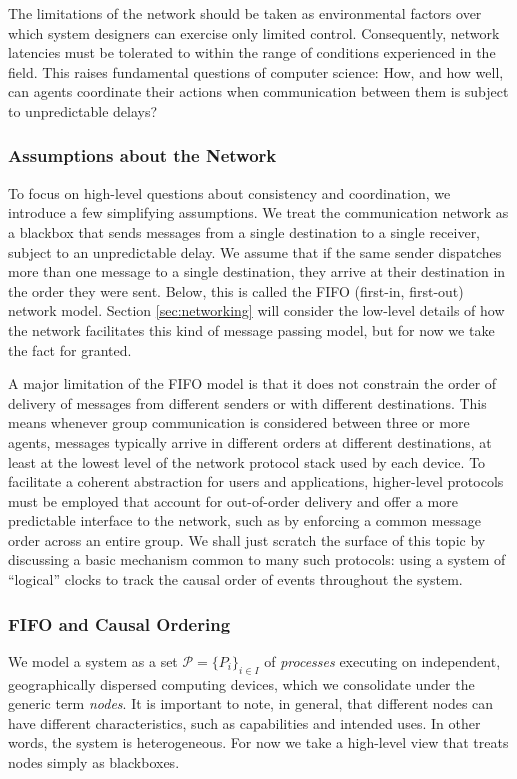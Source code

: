 \documentclass[]             %
{NASA}                       %
\theoremstyle{definition}
\begin{document}
The limitations of the network should be taken as environmental
factors over which system designers can exercise only limited
control. Consequently, network latencies must be tolerated to within
the range of conditions experienced in the field. This raises
fundamental questions of computer science: How, and how well, can
agents coordinate their actions when communication between them is
subject to unpredictable delays?

\subsubsection{Assumptions about the Network}
To focus on high-level questions about consistency and coordination,
we introduce a few simplifying assumptions. We treat the communication
network as a blackbox that sends messages from a single destination to
a single receiver, subject to an unpredictable delay.  We assume that
if the same sender dispatches more than one message to a single
destination, they arrive at their destination in the order they were
sent. Below, this is called the FIFO (first-in, first-out) network
model. Section \ref{sec:networking} will consider the low-level
details of how the network facilitates this kind of message passing
model, but for now we take the fact for granted.

A major limitation of the FIFO model is that it does not constrain the
order of delivery of messages from different senders or with different
destinations. This means whenever group communication is considered
between three or more agents, messages typically arrive in different
orders at different destinations, at least at the lowest level of the
network protocol stack used by each device. To facilitate a coherent
abstraction for users and applications, higher-level protocols must be
employed that account for out-of-order delivery and offer a more
predictable interface to the network, such as by enforcing a common
message order across an entire group. We shall just scratch the
surface of this topic by discussing a basic mechanism common to many
such protocols: using a system of ``logical'' clocks to track the
causal order of events throughout the system.

\subsubsection{FIFO and Causal Ordering}

We model a system as a set \(\mathcal{P} = \{P_i\}_{i\in I}\) of
\emph{processes} executing on independent, geographically dispersed
computing devices, which we consolidate under the generic term
\emph{nodes}. It is important to note, in general, that different
nodes can have different characteristics, such as capabilities and
intended uses. In other words, the system is heterogeneous. For now we
take a high-level view that treats nodes simply as blackboxes.
\end{document}
